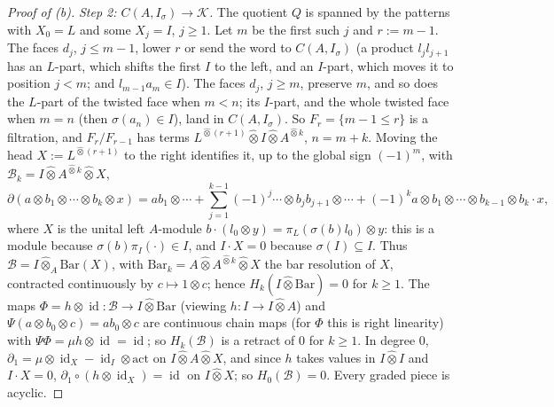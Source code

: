 \documentclass[11pt]{amsart}
\theoremstyle{definition}
\theoremstyle{remark}
\newcommand{\id}{\operatorname{id}}
\begin{document}
\begin{proof}[Proof of (b)]
\emph{Step 2: $C(A,I_\sigma)\to\mathcal K$.}  The quotient $Q$ is spanned by the
patterns with $X_0=L$ and some $X_j=I$, $j\ge1$.  Let $m$ be the first such $j$
and $r:=m-1$.  The faces $d_j$, $j\le m-1$, lower $r$ or send the word to
$C(A,I_\sigma)$ (a product $l_jl_{j+1}$ has an $L$-part, which shifts the first
$I$ to the left, and an $I$-part, which moves it to position $j<m$; and
$l_{m-1}a_m\in I$).  The faces $d_j$, $j\ge m$, preserve $m$, and so does the
$L$-part of the twisted face when $m<n$; its $I$-part, and the whole twisted face
when $m=n$ (then $\sigma(a_n)\in I$), land in $C(A,I_\sigma)$.  So
$F_r=\{m-1\le r\}$ is a filtration, and $F_r/F_{r-1}$ has terms
$L^{\widehat\otimes(r+1)}\widehat\otimes I\widehat\otimes A^{\widehat\otimes k}$,
$n=m+k$.  Moving the head $X:=L^{\widehat\otimes(r+1)}$ to the right
identifies it, up to the global sign $(-1)^m$, with
$\mathcal B_k=I\widehat\otimes A^{\widehat\otimes k}\widehat\otimes X$,
\[
\partial(a\otimes b_1\otimes\cdots\otimes b_k\otimes x)=ab_1\otimes\cdots
+\sum_{j=1}^{k-1}(-1)^j\cdots\otimes b_jb_{j+1}\otimes\cdots
+(-1)^ka\otimes b_1\otimes\cdots\otimes b_{k-1}\otimes b_k\cdot x ,
\]
where $X$ is the unital left $A$-module
$b\cdot(l_0\otimes y)=\pi_L(\sigma(b)l_0)\otimes y$: this is a module because
$\sigma(b)\pi_I(\cdot)\in I$, and $I\cdot X=0$ because $\sigma(I)\subseteq I$.
Thus $\mathcal B=I\widehat\otimes_A\mathrm{Bar}(X)$, with
$\mathrm{Bar}_k=A\widehat\otimes A^{\widehat\otimes k}\widehat\otimes X$ the bar
resolution of $X$, contracted continuously by $c\mapsto1\otimes c$; hence
$H_k(I\widehat\otimes\mathrm{Bar})=0$ for $k\ge1$.  The maps
$\Phi=h\otimes\id:\mathcal B\to I\widehat\otimes\mathrm{Bar}$ (viewing
$h:I\to I\widehat\otimes A$) and $\Psi(a\otimes b_0\otimes c)=ab_0\otimes c$ are
continuous chain maps (for $\Phi$ this is right linearity) with
$\Psi\Phi=\mu h\otimes\id=\id$; so $H_k(\mathcal B)$ is a retract of $0$ for
$k\ge1$.  In degree $0$, $\partial_1=\mu\otimes\id_X-\id_I\otimes\mathrm{act}$ on
$I\widehat\otimes A\widehat\otimes X$, and since $h$ takes values in
$I\widehat\otimes I$ and $I\cdot X=0$, $\partial_1\circ(h\otimes\id_X)=\id$ on
$I\widehat\otimes X$; so $H_0(\mathcal B)=0$.  Every graded piece is acyclic.
\end{proof}
\end{document}
